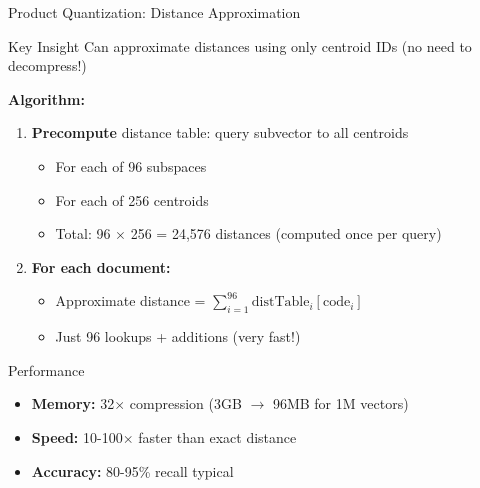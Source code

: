 \documentclass[aspectratio=169]{beamer}
\begin{document}
\begin{frame}[shrink=10]{Product Quantization: Distance Approximation}
\begin{block}{Key Insight}
Can approximate distances using only centroid IDs (no need to decompress!)
\end{block}

\vspace{1em}

\textbf{Algorithm:}
\begin{enumerate}
    \item \textbf{Precompute} distance table: query subvector to all centroids
    \begin{itemize}
        \item For each of 96 subspaces
        \item For each of 256 centroids
        \item Total: 96 $\times$ 256 = 24,576 distances (computed once per query)
    \end{itemize}
    
    \item \textbf{For each document:}
    \begin{itemize}
        \item Approximate distance = $\sum_{i=1}^{96} \text{distTable}_i[\text{code}_i]$
        \item Just 96 lookups + additions (very fast!)
    \end{itemize}
\end{enumerate}

\vspace{1em}

\begin{exampleblock}{Performance}
\begin{itemize}
    \item \textbf{Memory:} 32$\times$ compression (3GB $\rightarrow$ 96MB for 1M vectors)
    \item \textbf{Speed:} 10-100$\times$ faster than exact distance
    \item \textbf{Accuracy:} 80-95\% recall typical
\end{itemize}
\end{exampleblock}
\end{frame}
\end{document}
